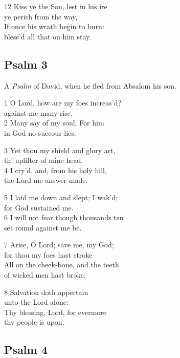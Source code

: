 \begin{multicols}{3}
12 Kiss ye the Son, lest in his ire \\
ye perish from the way, \\
If once his wrath begin to burn: \\
bless’d all that on him stay.

\begin{center}
\quad{}\quad{}
\end{center}

\subsection*{Psalm 3}

A \emph{Psalm} of David, when he fled from Absalom his son.

1 O Lord, how are my foes increas’d?\\
against me many rise.\\
2 Many say of my soul, For him\\
in God no succour lies.

3 Yet thou my shield and glory art,\\
th’ uplifter of mine head.\\
4 I cry’d, and, from his holy hill,\\
the Lord me answer made.

5 I laid me down and slept; I wak’d;\\
for God sustained me.\\
6 I will not fear though thousands ten\\
set round against me be.

7 Arise, O Lord; save me, my God;\\
for thou my foes hast stroke\\
All on the cheek-bone, and the teeth\\
of wicked men hast broke.

8 Salvation doth appertain\\
unto the Lord alone:\\
Thy blessing, Lord, for evermore\\
thy people is upon.

\begin{center}
\quad{}\quad{}
\end{center}


\subsection*{Psalm 4 }



\end{multicols}
